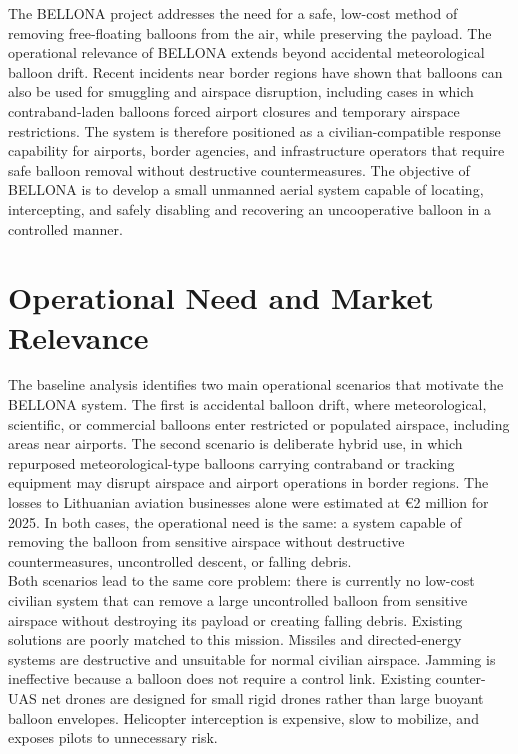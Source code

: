 The BELLONA project addresses the need for a safe, low-cost method of removing free-floating balloons from the air, while preserving the payload. The operational relevance of BELLONA extends beyond accidental meteorological balloon drift. Recent incidents near border regions have shown that balloons can also be used for smuggling and airspace disruption, including cases in which contraband-laden balloons forced airport closures and temporary airspace restrictions. The system is therefore positioned as a civilian-compatible response capability for airports, border agencies, and infrastructure operators that require safe balloon removal without destructive countermeasures. The objective of BELLONA is to develop a small unmanned aerial system capable of locating, intercepting, and safely disabling and recovering an uncooperative balloon in a controlled manner.

\section*{Operational Need and Market Relevance}

The baseline analysis identifies two main operational scenarios that motivate the BELLONA system. The first is accidental balloon drift, where meteorological, scientific, or commercial balloons enter restricted or populated airspace, including areas near airports. The second scenario is deliberate hybrid use, in which repurposed meteorological-type balloons carrying contraband or tracking equipment may disrupt airspace and airport operations in border regions. The losses to Lithuanian aviation businesses alone were estimated at €2 million for 2025.
In both cases, the operational need is the same: a system capable of removing the balloon from sensitive airspace without destructive countermeasures, uncontrolled descent, or falling debris. 
\\

Both scenarios lead to the same core problem: there is currently no low-cost civilian system that can remove a large uncontrolled balloon from sensitive airspace without destroying its payload or creating falling debris. Existing solutions are poorly matched to this mission. Missiles and directed-energy systems are destructive and unsuitable for normal civilian airspace. Jamming is ineffective because a balloon does not require a control link. Existing counter-UAS net drones are designed for small rigid drones rather than large buoyant balloon envelopes. Helicopter interception is expensive, slow to mobilize, and exposes pilots to unnecessary risk. 
\\

